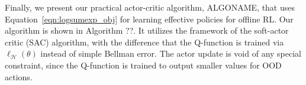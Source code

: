 
Finally, we present our practical actor-critic algorithm, ALGONAME, that uses Equation~\ref{eqn:logsumexp_obj} for learning effective policies for offline RL. Our algorithm is shown in Algorithm ??. It utilizes the framework of the soft-actor critic (SAC) algorithm, with the difference that the Q-function is trained via $\ell_\mathcal{H}(\theta)$ instead of simple Bellman error. The actor update is void of any special constraint, since the Q-function is trained to output smaller values for OOD actions.    


